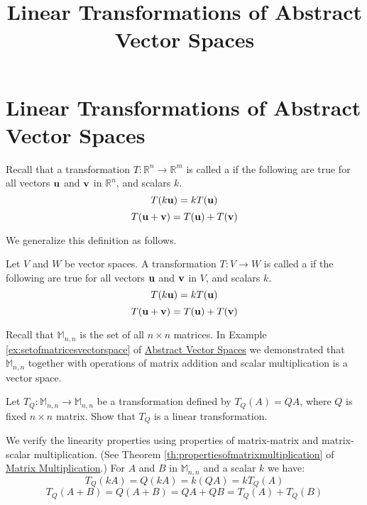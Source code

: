 \documentclass{ximera}
\title{Linear Transformations of Abstract Vector Spaces} \license{CC BY-NC-SA 4.0}
\begin{document}
\begin{abstract}
\end{abstract}
\maketitle

\section*{Linear Transformations of Abstract Vector Spaces}

Recall that a transformation $T:\mathbb{R}^n\rightarrow \mathbb{R}^m$ is called a  if the following are true for all vectors ${\bf u}$ and ${\bf v}$ in $\mathbb{R}^n$, and scalars $k$.
\begin{equation*}
T(k{\bf u})= kT({\bf u})
\end{equation*}
\begin{equation*}
T({\bf u}+{\bf v})= T({\bf u})+T({\bf v})
\end{equation*}

We generalize this definition as follows.

\begin{definition}\label{def:lintransgeneral}
Let $V$ and $W$ be vector spaces. A transformation $T:V\rightarrow W$ is called a  if the following are true for all vectors ${\bf u}$ and ${\bf v}$ in $V$, and scalars $k$.
\begin{equation*}
T(k{\bf u})= kT({\bf u})
\end{equation*}
\begin{equation*}
T({\bf u}+{\bf v})= T({\bf u})+T({\bf v})
\end{equation*}
\end{definition}

\begin{example}\label{ex:abstvectsplintransM22}
Recall that $\mathbb{M}_{n,n}$ is the set of all $n\times n$ matrices.  In Example \ref{ex:setofmatricesvectorspace} of \href{https://ximera.osu.edu/oerlinalg/LinearAlgebra/VSP-0050/main}{Abstract Vector Spaces} we demonstrated that $\mathbb{M}_{n,n}$ together with operations of matrix addition and scalar multiplication is a vector space.

Let $T_Q:\mathbb{M}_{n,n}\rightarrow \mathbb{M}_{n,n}$ be a transformation defined by $T_Q(A)=QA$, where $Q$ is fixed $n\times n$ matrix.  Show that $T_Q$ is a linear transformation.
\begin{explanation}
We verify the linearity properties using properties of matrix-matrix and matrix-scalar multiplication.  (See Theorem \ref{th:propertiesofmatrixmultiplication} of \href{https://ximera.osu.edu/oerlinalg/LinearAlgebra/MAT-0020/main}{Matrix Multiplication}.)  For $A$ and $B$ in $\mathbb{M}_{n,n}$ and a scalar $k$ we have:
$$T_Q(kA)=Q(kA)=k(QA)=kT_Q(A)$$
$$T_Q(A+B)=Q(A+B)=QA+QB=T_Q(A)+T_Q(B)$$
\end{explanation}
\end{example}
\end{document}
